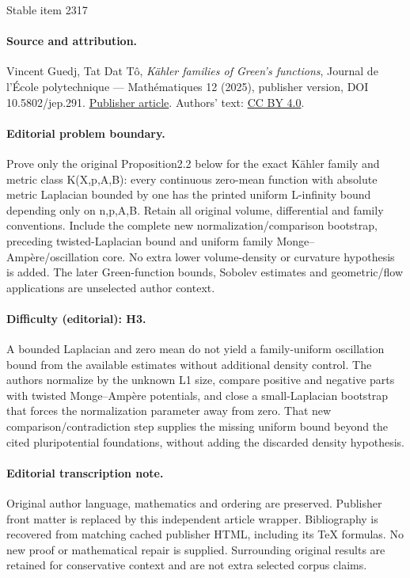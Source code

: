 \documentclass[11pt]{article}
\numberwithin{equation}{section}
\theoremstyle{definition}
\begin{document}
\begin{center}{\Large Stable item 2317}\end{center}
\paragraph{Source and attribution.}
Vincent Guedj, Tat Dat Tô, \emph{Kähler families of Green’s functions}, Journal de l’École polytechnique — Mathématiques 12 (2025), publisher version, DOI 10.5802/jep.291. \href{https://jep.centre-mersenne.org/articles/10.5802/jep.291/}{Publisher article}. Authors' text: \href{https://creativecommons.org/licenses/by/4.0/}{CC BY 4.0}.
\paragraph{Editorial problem boundary.}
Prove only the original Proposition2.2 below for the exact Kähler family and metric class K(X,p,A,B): every continuous zero-mean function with absolute metric Laplacian bounded by one has the printed uniform L-infinity bound depending only on n,p,A,B. Retain all original volume, differential and family conventions. Include the complete new normalization/comparison bootstrap, preceding twisted-Laplacian bound and uniform family Monge–Ampère/oscillation core. No extra lower volume-density or curvature hypothesis is added. The later Green-function bounds, Sobolev estimates and geometric/flow applications are unselected author context.
\paragraph{Difficulty (editorial): H3.}
A bounded Laplacian and zero mean do not yield a family-uniform oscillation bound from the available estimates without additional density control. The authors normalize by the unknown L1 size, compare positive and negative parts with twisted Monge–Ampère potentials, and close a small-Laplacian bootstrap that forces the normalization parameter away from zero. That new comparison/contradiction step supplies the missing uniform bound beyond the cited pluripotential foundations, without adding the discarded density hypothesis.
\paragraph{Editorial transcription note.}
Original author language, mathematics and ordering are preserved. Publisher front matter is replaced by this independent article wrapper. Bibliography is recovered from matching cached publisher HTML, including its TeX formulas. No new proof or mathematical repair is supplied. Surrounding original results are retained for conservative context and are not extra selected corpus claims.
\clearpage
\end{document}
